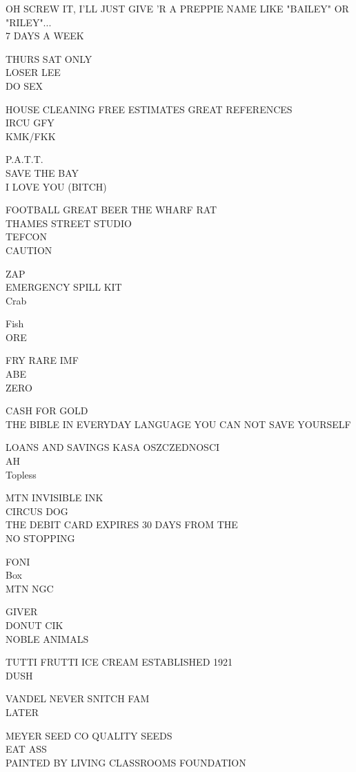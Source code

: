 \documentclass[10pt,letterpaper]{article}
\begin{document}
OH SCREW IT, I'LL JUST GIVE 'R A PREPPIE NAME LIKE "BAILEY" OR "RILEY"...\\
7 DAYS A WEEK

THURS SAT ONLY\\
LOSER LEE\\
DO SEX

HOUSE CLEANING FREE ESTIMATES GREAT REFERENCES\\
IRCU GFY\\
KMK/FKK

P.A.T.T.\\
SAVE THE BAY\\
I LOVE YOU (BITCH)

FOOTBALL GREAT BEER THE WHARF RAT\\
THAMES STREET STUDIO\\
TEFCON\\
CAUTION

ZAP\\
EMERGENCY SPILL KIT\\
Crab

Fish\\
ORE

FRY RARE IMF\\
ABE\\
ZERO

CASH FOR GOLD\\
THE BIBLE IN EVERYDAY LANGUAGE YOU CAN NOT SAVE YOURSELF

LOANS AND SAVINGS KASA OSZCZEDNOSCI\\
AH\\
Topless

MTN INVISIBLE INK\\
CIRCUS DOG\\
THE DEBIT CARD EXPIRES 30 DAYS FROM THE\\
NO STOPPING

FONI\\
Box\\
MTN NGC

GIVER\\
DONUT CIK\\
NOBLE ANIMALS

TUTTI FRUTTI ICE CREAM ESTABLISHED 1921\\
DUSH

VANDEL NEVER SNITCH FAM\\
LATER

MEYER SEED CO QUALITY SEEDS\\
EAT ASS\\
PAINTED BY LIVING CLASSROOMS FOUNDATION
\end{document}
